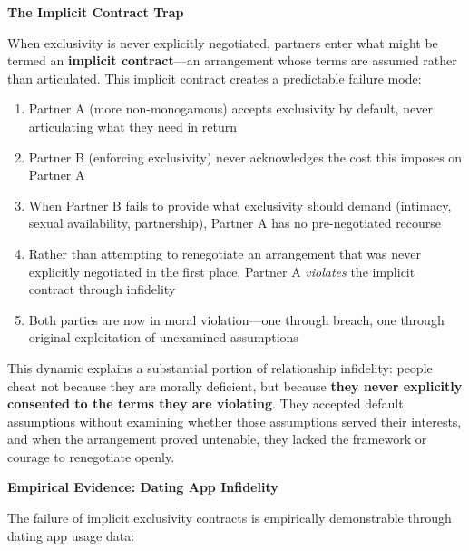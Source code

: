 \documentclass[12pt, letterpaper]{article}
\begin{document}
\textbf{The Implicit Contract Trap}

When exclusivity is never explicitly negotiated, partners enter what might be termed an \textbf{implicit contract}---an arrangement whose terms are assumed rather than articulated. This implicit contract creates a predictable failure mode:

\begin{enumerate}
    \item Partner A (more non-monogamous) accepts exclusivity by default, never articulating what they need in return
    \item Partner B (enforcing exclusivity) never acknowledges the cost this imposes on Partner A
    \item When Partner B fails to provide what exclusivity should demand (intimacy, sexual availability, partnership), Partner A has no pre-negotiated recourse
    \item Rather than attempting to renegotiate an arrangement that was never explicitly negotiated in the first place, Partner A \textit{violates} the implicit contract through infidelity
    \item Both parties are now in moral violation---one through breach, one through original exploitation of unexamined assumptions
\end{enumerate}

This dynamic explains a substantial portion of relationship infidelity: people cheat not because they are morally deficient, but because \textbf{they never explicitly consented to the terms they are violating}. They accepted default assumptions without examining whether those assumptions served their interests, and when the arrangement proved untenable, they lacked the framework or courage to renegotiate openly.

\textbf{Empirical Evidence: Dating App Infidelity}

The failure of implicit exclusivity contracts is empirically demonstrable through dating app usage data:
\end{document}
